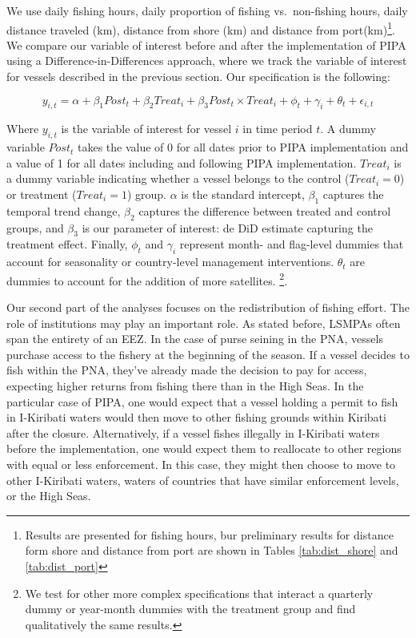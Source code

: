 \documentclass[11pt,]{article}
\let\rmarkdownfootnote\footnote%
\def\footnote{\protect\rmarkdownfootnote}
\begin{document}
We use daily fishing hours, daily proportion of fishing vs.~non-fishing
hours, daily distance traveled (km), distance from shore (km) and
distance from
port(km)\footnote{Results are presented for fishing hours, bur preliminary results for distance form shore and distance from port are shown in Tables \ref{tab:dist_shore} and \ref{tab:dist_port}}.
We compare our variable of interest before and after the implementation
of PIPA using a Difference-in-Differences approach, where we track the
variable of interest for vessels described in the previous section. Our
specification is the following:

\[
y_{i,t} = \alpha + \beta_1 Post_t + \beta_2 Treat_i + \beta_3 Post_t \times Treat_i + \phi_t + \gamma_i + \theta_t + \epsilon_{i,t}
\]

Where \(y_{i,t}\) is the variable of interest for vessel \(i\) in time
period \(t\). A dummy variable \(Post_t\) takes the value of 0 for all
dates prior to PIPA implementation and a value of 1 for all dates
including and following PIPA implementation. \(Treat_i\) is a dummy
variable indicating whether a vessel belongs to the control
(\(Treat_i = 0\)) or treatment (\(Treat_i = 1\)) group. \(\alpha\) is
the standard intercept, \(\beta_1\) captures the temporal trend change,
\(\beta_2\) captures the difference between treated and control groups,
and \(\beta_3\) is our parameter of interest: de DiD estimate capturing
the treatment effect. Finally, \(\phi_t\) and \(\gamma_i\) represent
month- and flag-level dummies that account for seasonality or
country-level management interventions. \(\theta_t\) are dummies to
account for the addition of more satellites.
\footnote{We test for other more complex specifications that interact a quarterly dummy or year-month dummies with the treatment group and find qualitatively the same results.}.

Our second part of the analyses focuses on the redistribution of fishing
effort. The role of institutions may play an important role. As stated
before, LSMPAs often span the entirety of an EEZ. In the case of purse
seining in the PNA, vessels purchase access to the fishery at the
beginning of the season. If a vessel decides to fish within the PNA,
they've already made the decision to pay for access, expecting higher
returns from fishing there than in the High Seas. In the particular case
of PIPA, one would expect that a vessel holding a permit to fish in
I-Kiribati waters would then move to other fishing grounds within
Kiribati after the closure. Alternatively, if a vessel fishes illegally
in I-Kiribati waters before the implementation, one would expect them to
reallocate to other regions with equal or less enforcement. In this
case, they might then choose to move to other I-Kiribati waters, waters
of countries that have similar enforcement levels, or the High Seas.
\end{document}
